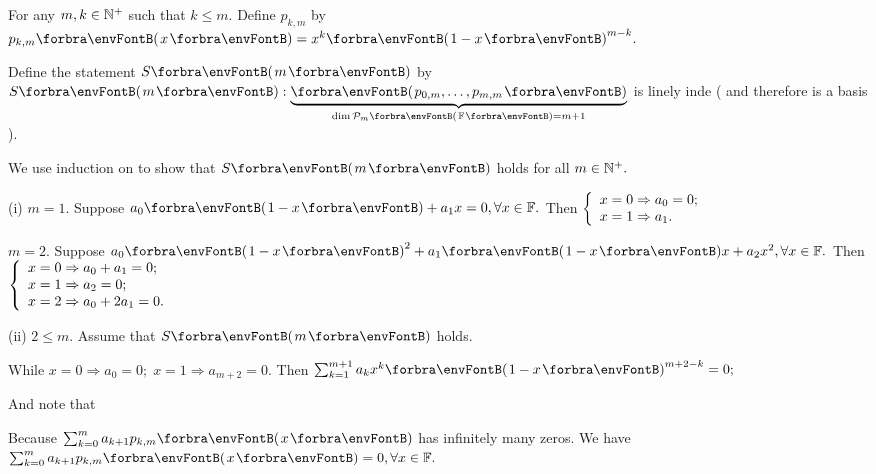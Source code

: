 \documentclass[a4paper, 11pt, UTF8]{article}
\begin{document}
\begin{large}
\Or For any $m,k\in\Nbp$ such that $k\leqslant m.$ Define $p_{k,m}$ by $p_{k,m}\Par{x}=x^k\Par{1-x}^{m-k}.$\par\quad
Define the statement $S\Par{m}$ by $S\Par{m}:\underbrace{\Par{p_{0,m},\dots,p_{m,m}}}_{\dim\PoF{m}=m+1}$ is linely inde ( and therefore is a basis ).\vspace{4pt}\par\quad
We use induction on to show that $S\Par{m}$ holds for all $m\in\Nbp.$\par\quad
(i) $m=1.$ Suppose $a_0\Par{1-x}+a_1x=0,\forall x\in\Fbb.$ Then $\MathLeftBrace{l}{x=0\Rightarrow a_0=0;\\x=1\Rightarrow a_1.}$\par\quad\Hi
$m=2.$ Suppose $a_0\Par{1-x}^2+a_1\Par{1-x}x+a_2x^2,\forall x\in\Fbb.$ Then $\MathLeftBrace{l}{x=0\Rightarrow a_0+a_1=0;\\x=1\Rightarrow a_2=0;\\x=2\Rightarrow a_0+2a_1=0.}$\par\vspace{6pt}\quad\Endi
(ii) $2\leqslant m.$ Assume that $S\Par{m}$ holds.\par\quad\Hii
{}\par\quad\Hii
{\vspace{6pt}While {\Large$x=0\Rightarrow a_0=0;\;x=1\Rightarrow a_{m+2}=0.$} Then {\Large$\sum_{k=1}^{m+1}a_kx^k\Par{1-x}^{m+2-k}=0;$}}\par\quad\Hii
{\vspace{6pt}And note that \Large{}}\vspace{10pt}\par\quad\Hii
{}\par\quad\Hii
{\vspace{6pt}Because $\sum_{k=0}^{m}a_{k+1}p_{k,m}\Par{x}$ has infinitely many zeros. We have $\sum_{k=0}^{m}a_{k+1}p_{k,m}\Par{x}=0,\forall x\in\Fbb.$}\par\quad\Hii

\end{large}
\end{document}
